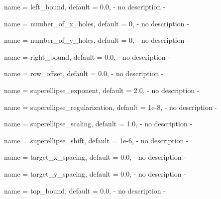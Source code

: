 \begin{parameter}{
    name    = {left_bound},
    default = {0.0},
}
- no description -
\end{parameter}

\begin{parameter}{
    name    = {number_of_x_holes},
    default = {0},
}
- no description -
\end{parameter}

\begin{parameter}{
    name    = {number_of_y_holes},
    default = {0},
}
- no description -
\end{parameter}

\begin{parameter}{
    name    = {right_bound},
    default = {0.0},
}
- no description -
\end{parameter}

\begin{parameter}{
    name    = {row_offset},
    default = {0.0},
}
- no description -
\end{parameter}

\begin{parameter}{
    name    = {superellipse_exponent},
    default = {2.0},
}
- no description -
\end{parameter}

\begin{parameter}{
    name    = {superellipse_regularization},
    default = {1e-8},
}
- no description -
\end{parameter}

\begin{parameter}{
    name    = {superellipse_scaling},
    default = {1.0},
}
- no description -
\end{parameter}

\begin{parameter}{
    name    = {superellipse_shift},
    default = {1e-6},
}
- no description -
\end{parameter}

\begin{parameter}{
    name    = {target_x_spacing},
    default = {0.0},
}
- no description -
\end{parameter}

\begin{parameter}{
    name    = {target_y_spacing},
    default = {0.0},
}
- no description -
\end{parameter}

\begin{parameter}{
    name    = {top_bound},
    default = {0.0},
}
- no description -
\end{parameter}

